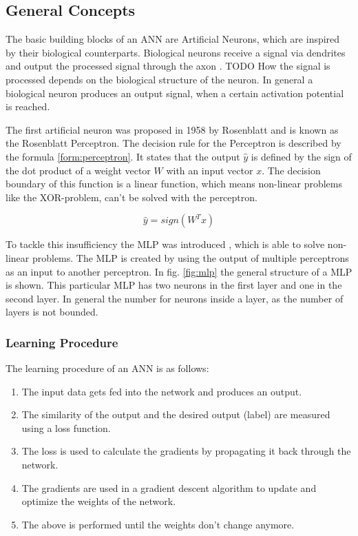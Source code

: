\subsection{General Concepts}
\label{sec:deep_basics}

The basic building blocks of an \ac{ANN} are Artificial Neurons, which are inspired by  their biological counterparts.
Biological neurons receive a signal via dendrites and output the processed signal through the axon \cite{bioneuron}.
TODO How the signal is processed depends on the biological structure of the neuron.
In general a biological neuron produces an output signal, when a certain activation potential is reached.

The first artificial neuron was proposed in 1958 by Rosenblatt \cite{perceptron} and is known as the Rosenblatt Perceptron.
The decision rule for the Perceptron is described by the formula \ref{form:perceptron}.
It states that the output $\hat{y}$ is defined by the sign of the dot product of a weight vector $W$ with an input vector $x$.
The decision boundary of this function is a linear function, which means non-linear problems like the XOR-problem, can't be solved with the perceptron.

\begin{equation}
    \hat{y} = sign(W^Tx)
    \label{form:perceptron}
\end{equation}

To tackle this insufficiency the \ac{MLP} was introduced \cite{mlp}, which is able to solve non-linear problems.
The \ac{MLP} is created by using the output of multiple perceptrons as an input to another perceptron.
In fig. \ref{fig:mlp} the general structure of a \ac{MLP} is shown.
This particular \ac{MLP} has two neurons in the first layer and one in the second layer.
In general the number for neurons inside a layer, as the number of layers is not bounded.

\subsubsection{Learning Procedure}
The learning procedure of an \ac{ANN} is as follows:

\begin{enumerate}
    \item The input data gets fed into the network and produces an output.
    \item The similarity of the output and the desired output (label) are measured using a loss function.
    \item The loss is used to calculate the gradients by propagating it back through the network.
    \item The gradients are used in a gradient descent algorithm to update and optimize the weights of the network.
    \item The above is performed until the weights don't change anymore.
\end{enumerate}

